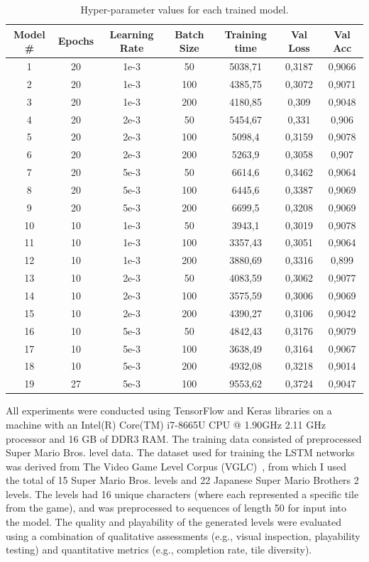 \documentclass[runningheads]{llncs}
\begin{document}
\begin{table}
\centering
\begin{tabular}{|c|c|c|c|c|c|c|}
\hline
Model \# &  Epochs & Learning Rate & Batch Size & Training time & Val Loss & Val Acc\\
\hline
1 & 20 & 1e-3 & 50 & 5038,71 & 0,3187 & 0,9066\\
2 & 20 & 1e-3 & 100 & 4385,75 & 0,3072 & 0,9071\\
3 & 20 & 1e-3 & 200 & 4180,85 & 0,309 & 0,9048\\
4 & 20 & 2e-3 & 50 & 5454,67 & 0,331 & 0,906\\
5 & 20 & 2e-3 & 100 & 5098,4 & 0,3159 & 0,9078\\
6 & 20 & 2e-3 & 200 & 5263,9 & 0,3058 & 0,907\\
7 & 20 & 5e-3 & 50 & 6614,6 & 0,3462 & 0,9064\\
8 & 20 & 5e-3 & 100 & 6445,6 & 0,3387 & 0,9069\\
9 & 20 & 5e-3 & 200 & 6699,5 & 0,3208 & 0,9069\\
10 & 10 & 1e-3 & 50 & 3943,1 & 0,3019 & 0,9078\\
11 & 10 & 1e-3 & 100 & 3357,43 & 0,3051 & 0,9064\\
12 & 10 & 1e-3 & 200 & 3880,69 & 0,3316 & 0,899\\
13 & 10 & 2e-3 & 50 & 4083,59 & 0,3062 & 0,9077\\
14 & 10 & 2e-3 & 100 & 3575,59 & 0,3006 & 0,9069\\
15 & 10 & 2e-3 & 200 & 4390,27 & 0,3106 & 0,9042\\
16 & 10 & 5e-3 & 50 & 4842,43 & 0,3176 & 0,9079\\
17 & 10 & 5e-3 & 100 & 3638,49 & 0,3164 & 0,9067\\
18 & 10 & 5e-3 & 200 & 4932,08 & 0,3218 & 0,9014\\
19 & 27 & 5e-3 & 100 & 9553,62 & 0,3724 & 0,9047\\
\hline
\end{tabular}
\newline
\caption{Hyper-parameter values for each trained model.}\label{tab1}
\end{table}

All experiments were conducted using TensorFlow and Keras libraries on a machine with an Intel(R) Core(TM) i7-8665U CPU @ 1.90GHz 2.11 GHz processor and 16 GB of DDR3 RAM. The training data consisted of preprocessed Super Mario Bros. level data. The dataset used for training the LSTM networks was derived from The Video Game Level Corpus (VGLC)~\cite{ref_article16}, from which I used the total of 15 Super Mario Bros. levels and 22 Japanese Super Mario Brothers 2 levels. The levels had 16 unique characters (where each represented a specific tile from the game), and was preprocessed to sequences of length 50 for input into the model. The quality and playability of the generated levels were evaluated using a combination of qualitative assessments (e.g., visual inspection, playability testing) and quantitative metrics (e.g., completion rate, tile diversity).
\end{document}
